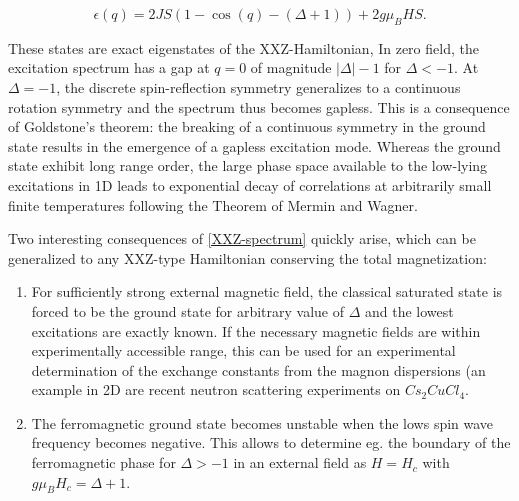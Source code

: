 \documentclass{homework}
\begin{document}
\begin{equation}
    \epsilon(q) = 2 J S (1-\cos(q) - (\Delta + 1)) + 2g \mu_B H S. 
    \label{XXZ-spectrum}
\end{equation}

These states are exact eigenstates of the XXZ-Hamiltonian, In zero field, the excitation spectrum has a gap at $q=0$ of magnitude $|\Delta| - 1$ for $\Delta < -1$. At $\Delta = -1$, the discrete spin-reflection symmetry generalizes to a continuous rotation symmetry and the spectrum thus becomes gapless. This is a consequence of Goldstone's theorem: the breaking of a continuous symmetry in the ground state results in the emergence of a gapless excitation mode. Whereas the ground state exhibit long range order, the large phase space available to the low-lying excitations in 1D leads to exponential decay of correlations at arbitrarily small finite temperatures following the Theorem of Mermin and Wagner. \\


\begin{tcolorbox}[colback = my-blue, title = Physical Context]

Two interesting consequences of \cref{XXZ-spectrum} quickly arise, which can be generalized to any XXZ-type Hamiltonian conserving the total magnetization: 

\begin{enumerate}
    \item For sufficiently strong external magnetic field, the classical saturated state is forced to be the ground state for arbitrary value of $\Delta$ and the lowest excitations are exactly known. If the necessary magnetic fields are within experimentally accessible range, this can be used for an experimental determination of the exchange constants from the magnon dispersions (an example in 2D are recent neutron scattering experiments on $Cs_2 Cu Cl_4$. \\
    \item The ferromagnetic ground state becomes unstable when the lows spin wave frequency becomes negative. This allows to determine eg. the boundary of the ferromagnetic phase for $\Delta > -1$ in an external field as $H = H_c$ with $g \mu_B H_c = \Delta + 1$. 
\end{enumerate}


\end{tcolorbox}

\blanky \\
\end{document}
